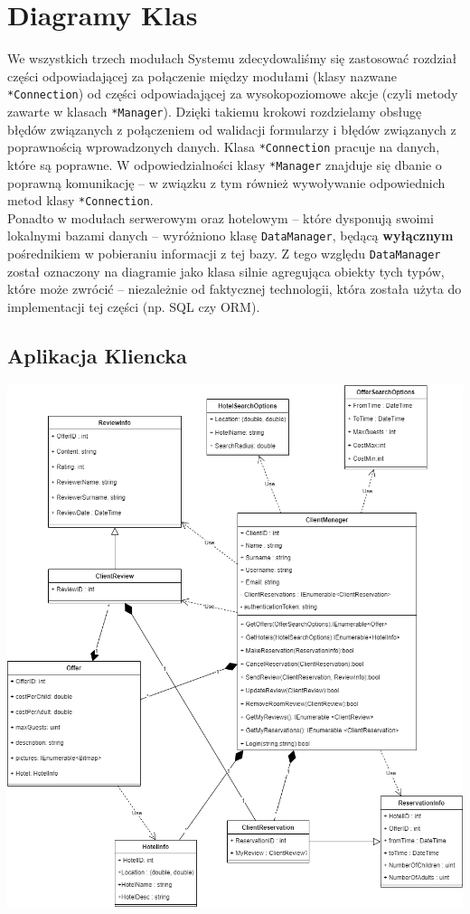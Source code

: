 \documentclass{article}
\begin{document}
\section{Diagramy Klas}
We wszystkich trzech modułach Systemu zdecydowaliśmy się zastosować rozdział części odpowiada\-jącej za połączenie między modułami (klasy nazwane \texttt{*Connection}) od części odpowiadającej za wysokopo\-ziomowe akcje (czyli metody zawarte w klasach \texttt{*Manager}). Dzięki takiemu krokowi rozdzie\-lamy obsługę błędów związanych z połączeniem od walidacji formularzy i błędów związanych z poprawnością wprowadzonych danych. Klasa \texttt{*Connection} pracuje na danych, które są poprawne. W odpowiedzialności klasy \texttt{*Manager} znajduje się dbanie o poprawną komunikację – w związku z tym również wywoływanie odpowiednich metod klasy \texttt{*Connection}.\\
Ponadto w modułach serwerowym oraz hotelowym – które dysponują swoimi lokalnymi bazami danych – wyróżniono klasę \texttt{DataManager}, będącą \textbf{wyłącznym} pośrednikiem w pobieraniu informacji z tej bazy. Z tego względu \texttt{DataManager} został oznaczony na diagramie jako klasa silnie agregująca obiekty tych typów, które może zwrócić – niezależnie od faktycznej technologii, która została użyta do implementacji tej części (np. SQL czy ORM).

\subsection{Aplikacja Kliencka}
\begin{center}
    \includegraphics[scale=0.45]{checkpoint1/IO Klasy-Client_App_Module.png}
\end{center}
\end{document}
